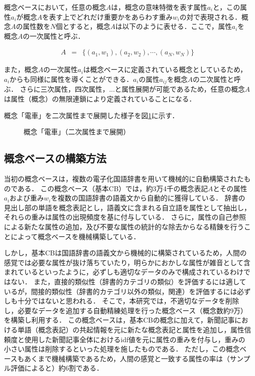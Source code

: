 概念ベースにおいて，任意の概念$A$は，概念の意味特徴を表す属性$a_i$と，この属性$a_i$が概念$A$を表す上でどれだけ重要かをあらわす重み$w_i$の対で表現される．概念$A$の属性数を$N$個とすると，概念$A$は以下のように表せる．ここで，属性$a_i$を概念$A$の一次属性と呼ぶ．

\begin{eqnarray}
A &=& \{ (a_1, w_1), (a_2, w_2), \cdots, (a_N, w_N) \}
\end{eqnarray}

また，概念$A$の一次属性$a_i$は概念ベースに定義されている概念としているため，$a_i$からも同様に属性を導くことができる．$a_i$の属性$a_{ij}$を概念$A$の二次属性と呼ぶ．
さらに三次属性，四次属性，...と属性展開が可能であるため，任意の概念$A$は属性（概念）の無限連鎖により定義されていることになる．

概念「電車」を二次属性まで展開した様子を図\ref{Fig1}に示す．

\begin{figure}[tb]
\begin{center}
\end{center}
\caption{概念「電車」（二次属性まで展開）}
\label{Fig1}
\end{figure}


\subsection{概念ベースの構築方法}

当初の概念ベースは，複数の電子化国語辞書を用いて機械的に自動構築されたものである．
この概念ベース（基本CB）\cite{kasahara1,kasahara4}では，約3万4千の概念表記$A$とその属性$a_i$および重み$w_i$を複数の国語辞書の語義文から自動的に獲得している．
辞書の見出し部の単語を概念表記とし，語義文に含まれる自立語を属性として抽出し，それらの重みは属性の出現頻度を基に付与している．
さらに，属性の自己参照による新たな属性の追加，及び不要な属性の統計的な除去からなる精錬を行うことによって概念ベースを機械構築している．

しかし，基本CBは国語辞書の語義文から機械的に構築されているため，人間の感覚では必要な属性が抜け落ちていたり，明らかにおかしな属性が雑音として含まれているといったように，必ずしも適切なデータのみで構成されているわけではない．
また，直接的類似性（辞書的カテゴリの類似）を評価するには適しているが，間接的類似性（辞書的カテゴリ以外の類似，関連）を評価するには必ずしも十分ではないと思われる．
そこで，本研究では，不適切なデータを削除し，必要なデータを追加する自動精練処理を行った概念ベース（概念数約9万）\cite{Hirose}を構築し利用する．
この概念ベースは，基本CBの概念に加えて，新聞記事における単語（概念表記）の共起情報を元に新たな概念表記と属性を追加し，属性信頼度\cite{KKojima,KKojima2}と使用した新聞記事全体におけるidf値を元に属性の重みを付与し，重みの小さい属性は削除するといった処理を施したものである．
ただし，この概念ベースもあくまで機械構築であるため，人間の感覚と一致する属性の率は（サンプル評価によると）約6割である．


